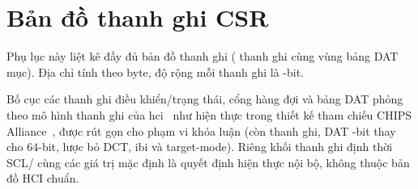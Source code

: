 \chapter{Bản đồ thanh ghi CSR}
\label{app:csr}

Phụ lục này liệt kê đầy đủ bản đồ thanh ghi (\CsrRegisterCount{} thanh ghi cùng vùng bảng
DAT \DatEntryCount{} mục). Địa chỉ tính theo byte, độ rộng mỗi thanh ghi là \RegisterDataWidth{}-bit.

Bố cục các thanh ghi điều khiển/trạng thái, cổng hàng đợi và bảng DAT phỏng theo mô hình thanh ghi của \gls{hci}~\cite{mipi_i3c_hci} như hiện thực trong thiết kế tham chiếu CHIPS Alliance~\cite{chipsalliance_i3c}, được rút gọn cho phạm vi khóa luận (còn \CsrRegisterCount{} thanh ghi, DAT \DatEntryWidth{}-bit thay cho 64-bit, lược bỏ DCT, \gls{ibi} và target-mode). Riêng khối thanh ghi định thời SCL/\iic{} cùng các giá trị mặc định là quyết định hiện thực nội bộ, không thuộc bản đồ HCI chuẩn.

